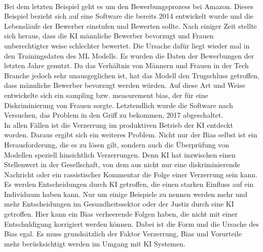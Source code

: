 \begin{onehalfspace}
        \\
        Bei dem letzten Beispiel geht es um den Bewerbungsprozess bei Amazon. Dieses Beispiel bezieht sich auf eine Software die bereits 2014 entwickelt wurde und die Lebensläufe der Bewerber einstufen und Bewerten sollte. Nach einiger Zeit stellte sich heraus, dass die \ac*{KI} männliche Bewerber bevorzugt und Frauen unberechtigter weise schlechter bewertet. Die Ursache dafür liegt wieder mal in den Trainingsdaten des \ac*{ML} Modells. Es wurden die Daten der Bewerbungen der letzten Jahre genutzt. Da das Verhältnis von Männern und Frauen in der Tech Branche jedoch sehr unausgeglichen ist, hat das Modell den Trugschluss getroffen, dass männliche Bewerber bevorzugt werden würden. Auf diese Art und Weise entwickelte sich ein sampling bzw. measurement bias, der für eine Diskriminierung von Frauen sorgte. Letztendlich wurde die Software nach Versuchen, das Problem in den Griff zu bekommen, 2017 abgeschaltet.\cite{Cremers2019}\cite{IncidentDatabase2015_37}
        \\
        In allen Fällen ist die Verzerrung im produktiven Betrieb der \ac*{KI} entdeckt worden. Daraus ergibt sich ein weiteres Problem. Nicht nur der Bias selbst ist ein Herausforderung, die es zu lösen gilt, sondern auch die Überprüfung von Modellen speziell hinsichtlich Verzerrungen. Denn \ac*{KI} hat inzwischen einen Stellenwert in der Gesellschaft, von dem aus nicht nur eine diskriminierende Nachricht oder ein rassistischer Kommentar die Folge einer Verzerrung sein kann. Es werden Entscheidungen durch \ac*{KI} getroffen, die einen starken Einfluss auf ein Individuum haben kann. Nur um einige Beispiele zu nennen werden mehr und mehr Entscheidungen im Gesundheitssektor oder der Justiz durch eine \ac*{KI} getroffen. Hier kann ein Bias verheerende Folgen haben, die nicht mit einer Entschuldigung korrigiert werden können.\cite{hagendorff2019maschinelles} Dabei ist die Form und die Ursache des Bias egal. Es muss grundsätzlich der Faktor Verzerrung, Bias und Vorurteile mehr berücksichtigt werden im Umgang mit \ac*{KI} Systemen.\cite{Drew2019}
    

\end{onehalfspace}
